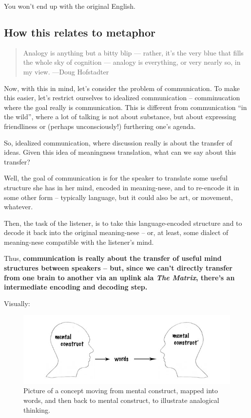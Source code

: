 You won't end up with the original English.

\subsection{How this relates to
metaphor}\label{how-this-relates-to-metaphor}

\begin{quote}
Analogy is anything but a bitty blip --- rather, it's the very blue that
fills the whole sky of cognition --- analogy is everything, or very
nearly so, in my view. \label{quote-attribute}{---Doug Hofstadter}
\end{quote}

Now, with this in mind, let's consider the problem of communication. To
make this easier, let's restrict ourselves to idealized communication --
comminucation where the goal really is communication. This is different
from communication ``in the wild'', where a lot of talking is not about
substance, but about expressing friendliness or (perhaps unconsciously!)
furthering one's agenda.

So, idealized communication, where discussion really is about the
transfer of ideas. Given this idea of meaningness translation, what can
we say about this transfer?

Well, the goal of communication is for the speaker to translate some
useful structure she has in her mind, encoded in meaning-nese, and to
re-encode it in some other form -- typically language, but it could also
be art, or movement, whatever.

Then, the task of the listener, is to take this language-encoded
structure and to decode it back into the original meaning-nese -- or, at
least, some dialect of meaning-nese compatible with the listener's mind.

Thus, \textbf{communication is really about the transfer of useful mind
structures between speakers -- but, since we can't directly transfer
from one brain to another via an uplink ala \emph{The Matrix}, there's
an intermediate encoding and decoding step.}

Visually:

\begin{figure}[htbp]
\centering
\includegraphics[width=\textwidth]{graphics/analogical-thinking.jpg}
\caption{Picture of a concept moving from mental construct, mapped into
words, and then back to mental construct, to illustrate analogical
thinking.}
\end{figure}

